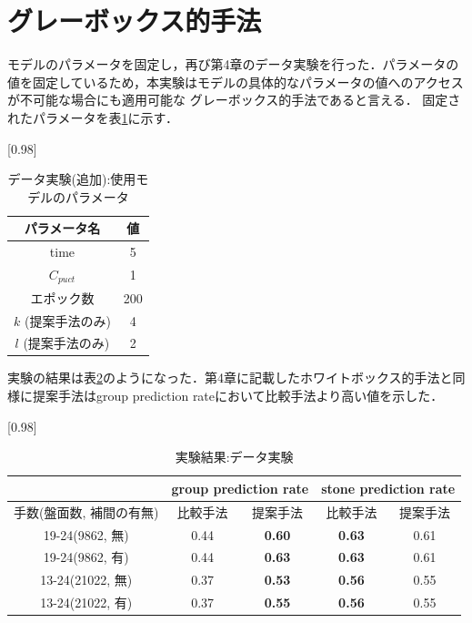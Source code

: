 \section{グレーボックス的手法}
\label{sec:gray}
モデルのパラメータを固定し，再び第4章のデータ実験を行った．パラメータの値を固定しているため，本実験はモデルの具体的なパラメータの値へのアクセスが不可能な場合にも適用可能な
グレーボックス的手法であると言える．
固定されたパラメータを表\ref{table:param-data-extra}に示す．
\begin{table}[H]
	\caption{データ実験(追加):使用モデルのパラメータ}
	\centering
	\scalebox{0.98}[0.98]{
		\begin{tabular}{c|c}
			パラメータ名 & 値 \\ \hline
			time    & 5 \\ 
			$C_{puct}$    & 1 \\
			エポック数 & 200 \\
			$k$ (提案手法のみ)     & 4 \\
			$l$ (提案手法のみ)     & 2 \\
		\end{tabular}
	}
	\label{table:param-data-extra}
\end{table}

実験の結果は表\ref{table:result-offline}のようになった．第4章に記載したホワイトボックス的手法と同様に提案手法はgroup prediction rateにおいて比較手法より高い値を示した．
\begin{table}[H]
	\caption{実験結果:データ実験}
	\centering
	\scalebox{0.98}[0.98]{
		\begin{tabular}{c|c|c|c|c}
			\multicolumn{1}{c}{} & \multicolumn{2}{|c|}{group prediction rate} 
			& \multicolumn{2}{c|}{stone prediction rate}\\ \hline \hline
			手数(盤面数, 補間の有無)  & 比較手法  & 提案手法 & 比較手法 & 提案手法  \\ \hline
			19-24(9862, 無) & 0.44& \bf{0.60} & \bf{0.63}　& 0.61  \\
			19-24(9862, 有)  & 0.44   & \bf{0.63}& \bf{0.63} & 0.61   \\
			13-24(21022, 無)   & 0.37  & \bf{0.53}& \bf{0.56} & 0.55  \\
			13-24(21022, 有)   & 0.37 & \bf{0.55}& \bf{0.56} & 0.55   \\
		\end{tabular}
	}
	\label{table:result-offline}
\end{table}
